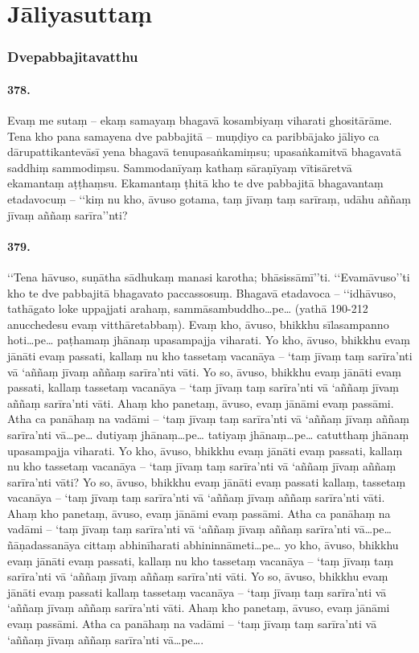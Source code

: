 \section{Jāliyasuttaṃ}

\subsubsection{Dvepabbajitavatthu}

\paragraph{378.} Evaṃ me sutaṃ – ekaṃ samayaṃ bhagavā kosambiyaṃ viharati ghositārāme. Tena kho pana samayena dve pabbajitā – muṇḍiyo ca paribbājako jāliyo ca dārupattikantevāsī yena bhagavā tenupasaṅkamiṃsu; upasaṅkamitvā bhagavatā saddhiṃ sammodiṃsu. Sammodanīyaṃ kathaṃ sāraṇīyaṃ vītisāretvā ekamantaṃ aṭṭhaṃsu. Ekamantaṃ ṭhitā kho te dve pabbajitā bhagavantaṃ etadavocuṃ – ‘‘kiṃ nu kho, āvuso gotama, taṃ jīvaṃ taṃ sarīraṃ, udāhu aññaṃ jīvaṃ aññaṃ sarīra’’nti?

\paragraph{379.} ‘‘Tena hāvuso, suṇātha sādhukaṃ manasi karotha; bhāsissāmī’’ti. ‘‘Evamāvuso’’ti kho te dve pabbajitā bhagavato paccassosuṃ. Bhagavā etadavoca – ‘‘idhāvuso, tathāgato loke uppajjati arahaṃ, sammāsambuddho…pe… (yathā 190-212 anucchedesu evaṃ vitthāretabbaṃ). Evaṃ kho, āvuso, bhikkhu sīlasampanno hoti…pe… paṭhamaṃ jhānaṃ upasampajja viharati. Yo kho, āvuso, bhikkhu evaṃ jānāti evaṃ passati, kallaṃ nu kho tassetaṃ vacanāya – ‘taṃ jīvaṃ taṃ sarīra’nti vā ‘aññaṃ jīvaṃ aññaṃ sarīra’nti vāti. Yo so, āvuso, bhikkhu evaṃ jānāti evaṃ passati, kallaṃ tassetaṃ vacanāya – ‘taṃ jīvaṃ taṃ sarīra’nti vā ‘aññaṃ jīvaṃ aññaṃ sarīra’nti vāti. Ahaṃ kho panetaṃ, āvuso, evaṃ jānāmi evaṃ passāmi. Atha ca panāhaṃ na vadāmi – ‘taṃ jīvaṃ taṃ sarīra’nti vā ‘aññaṃ jīvaṃ aññaṃ sarīra’nti vā…pe… dutiyaṃ jhānaṃ…pe… tatiyaṃ jhānaṃ…pe… catutthaṃ jhānaṃ upasampajja viharati. Yo kho, āvuso, bhikkhu evaṃ jānāti evaṃ passati, kallaṃ nu kho tassetaṃ vacanāya – ‘taṃ jīvaṃ taṃ sarīra’nti vā ‘aññaṃ jīvaṃ aññaṃ sarīra’nti vāti? Yo so, āvuso, bhikkhu evaṃ jānāti evaṃ passati kallaṃ, tassetaṃ vacanāya – ‘taṃ jīvaṃ taṃ sarīra’nti vā ‘aññaṃ jīvaṃ aññaṃ sarīra’nti vāti. Ahaṃ kho panetaṃ, āvuso, evaṃ jānāmi evaṃ passāmi. Atha ca panāhaṃ na vadāmi – ‘taṃ jīvaṃ taṃ sarīra’nti vā ‘aññaṃ jīvaṃ aññaṃ sarīra’nti vā…pe… ñāṇadassanāya cittaṃ abhinīharati abhininnāmeti…pe… yo kho, āvuso, bhikkhu evaṃ jānāti evaṃ passati, kallaṃ nu kho tassetaṃ vacanāya – ‘taṃ jīvaṃ taṃ sarīra’nti vā ‘aññaṃ jīvaṃ aññaṃ sarīra’nti vāti. Yo so, āvuso, bhikkhu evaṃ jānāti evaṃ passati kallaṃ tassetaṃ vacanāya – ‘taṃ jīvaṃ taṃ sarīra’nti vā ‘aññaṃ jīvaṃ aññaṃ sarīra’nti vāti. Ahaṃ kho panetaṃ, āvuso, evaṃ jānāmi evaṃ passāmi. Atha ca panāhaṃ na vadāmi – ‘taṃ jīvaṃ taṃ sarīra’nti vā ‘aññaṃ jīvaṃ aññaṃ sarīra’nti vā…pe….

